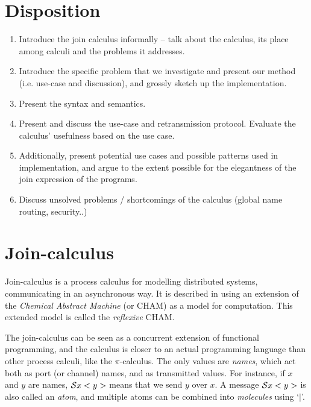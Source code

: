 \section{Disposition}

\begin{enumerate}

\item Introduce the join calculus informally -- talk about the calculus, its
place among calculi and the problems it addresses.

\item Introduce the specific problem that we investigate and present our method
(i.e. use-case and discussion), and grossly sketch up the implementation.

\item Present the syntax and semantics.

\item Present and discuss the use-case and retransmission protocol. Evaluate the calculus' usefulness based on the use case.
\item Additionally, present potential use cases and possible patterns used in implementation, and argue to the extent possible for the elegantness of the join expression of the programs.

\item Discuss unsolved problems / shortcomings of the calculus (global name
routing, security..)

\end{enumerate}

\section{Join-calculus}

Join-calculus is a process calculus for modelling distributed systems,
communicating in an asynchronous way. It is described in
\cite{fournet1996reflexive} using an extension of the \emph{Chemical Abstract
Machine}\cite{berry1989chemical} (or CHAM) as a model for computation. This
extended model is called the \emph{reflexive} CHAM.

The join-calculus can be seen as a concurrent extension of functional
programming, and the calculus is closer to an actual programming language than
other process calculi, like the $\pi$-calculus. The only values are
\emph{names}, which
act both as port (or channel) names, and as transmitted values. For instance, if
$x$ and $y$ are names, $\S x<y>$ means that we send $y$ over $x$. A message
$\S x<y>$ is also called an \emph{atom}, and multiple atoms can be combined
into \emph{molecules} using `$|$'.

